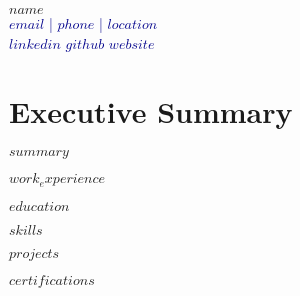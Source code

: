 \documentclass[11pt,a4paper]{article}
\begin{document}
\begin{center}
{\Huge\bfseries\color{darkblue} $name$}\\
\vspace{0.2cm}
\textcolor{darkblue}{$email$ | $phone$ | $location$}\\
\vspace{0.1cm}
\textcolor{darkblue}{$linkedin$ $github$ $website$}
\end{center}

\vspace{0.5cm}

\section{Executive Summary}
$summary$

$work_experience$

$education$

$skills$

$projects$

$certifications$
\end{document}
